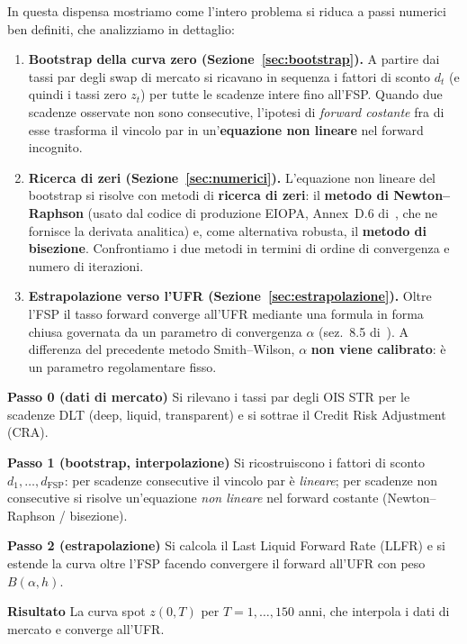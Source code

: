 \documentclass[11pt,a4paper]{article}
\theoremstyle{plain}
\theoremstyle{definition}
\theoremstyle{remark}
\newcommand{\FSP}{\mathrm{FSP}}
\newcommand{\estr}{\texteuro{}STR}
\begin{document}
In questa dispensa mostriamo come l'intero problema si riduca a passi numerici ben
definiti, che analizziamo in dettaglio:

\begin{enumerate}
  \item \textbf{Bootstrap della curva zero (Sezione~\ref{sec:bootstrap}).}
        A partire dai tassi par degli swap di mercato si ricavano in sequenza i
        fattori di sconto $d_t$ (e quindi i tassi zero $z_t$) per tutte le scadenze
        intere fino all'FSP. Quando due scadenze osservate non sono consecutive,
        l'ipotesi di \emph{forward costante} fra di esse trasforma il vincolo par in
        un'\textbf{equazione non lineare} nel forward incognito.

  \item \textbf{Ricerca di zeri (Sezione~\ref{sec:numerici}).}
        L'equazione non lineare del bootstrap si risolve con metodi di
        \textbf{ricerca di zeri}: il \textbf{metodo di Newton--Raphson} (usato dal
        codice di produzione EIOPA, Annex~D.6 di~\cite{eiopa2026}, che ne fornisce la
        derivata analitica) e, come alternativa robusta, il \textbf{metodo di
        bisezione}. Confrontiamo i due metodi in termini di ordine di convergenza e
        numero di iterazioni.

  \item \textbf{Estrapolazione verso l'UFR (Sezione~\ref{sec:estrapolazione}).}
        Oltre l'FSP il tasso forward converge all'UFR mediante una formula in forma
        chiusa governata da un parametro di convergenza $\alpha$ (sez.~8.5
        di~\cite{eiopa2026}). A differenza del precedente metodo Smith--Wilson,
        $\alpha$ \textbf{non viene calibrato}: \`e un parametro regolamentare fisso.
\end{enumerate}

\begin{keybox}
\textbf{Passo 0 (dati di mercato)} Si rilevano i tassi par degli OIS \estr{} per le
scadenze DLT (deep, liquid, transparent) e si sottrae il Credit Risk Adjustment (CRA).

\textbf{Passo 1 (bootstrap, interpolazione)} Si ricostruiscono i fattori di sconto
$d_1,\dots,d_{\FSP}$: per scadenze consecutive il vincolo par \`e \emph{lineare};
per scadenze non consecutive si risolve un'equazione \emph{non lineare} nel forward
costante (Newton--Raphson / bisezione).

\textbf{Passo 2 (estrapolazione)} Si calcola il Last Liquid Forward Rate (LLFR) e si
estende la curva oltre l'FSP facendo convergere il forward all'UFR con peso
$B(\alpha,h)$.

\textbf{Risultato} La curva spot $z(0,T)$ per $T = 1,\dots,150$ anni, che interpola
i dati di mercato e converge all'UFR.
\end{keybox}
\end{document}
